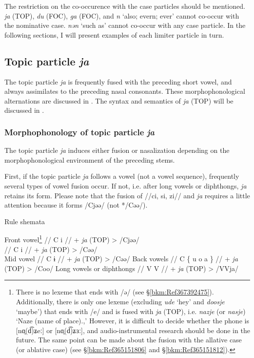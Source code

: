 The restriction on the co-occurence with the case particles should be mentioned. \textit{ja} (TOP), \textit{du} (FOC), \textit{ga} (FOC), and \textit{n} ‘also; evern; ever’ cannot co-occur with the nominative case. \textit{nən} ‘such as’ cannot co-occur with any case particle. In the following sections, I will present examples of each limiter particle in turn.

\subsection{Topic particle \textit{ja}}\label{sec:10.1.1}

The topic particle \textit{ja} is frequently fused with the preceding short vowel, and always assimilates to the preceding nasal consonants. These morphophonological alternations are discussed in . The syntax and semantics of \textit{ja} (TOP) will be discussed in .

\subsubsection{Morphophonology of topic particle \textit{ja}}\label{sec:10.1.1.1}

The topic particle \textit{ja} induces either fusion or nasalization depending on the morphophonological environment of the preceding stems.

First, if the topic particle \textit{ja} follows a vowel (not a vowel sequence), frequently several types of vowel fusion occur. If not, i.e. after long vowels or diphthongs, \textit{ja} retains its form. Please note that the fusion of //ci, si, zi// and \textit{ja} requires a little attention because it forms /Cjəə/ (not */Cəə/).

\begin{exe}
\ex \label{ex:10.1} Rule shemata\\
  \begin{xlist}
  \exi{}Front vowel\footnote{There is no lexeme that ends with /ə/ (see §\ref{bkm:Ref367392475}). Additionally, there is only one lexeme (excluding \textit{ude} ‘hey’ and \textit{doosje} ‘maybe’) that ends with /e/ and is fused with \textit{ja} (TOP), i.e. \textit{nazje} (or \textit{nasje}) ‘Naze (name of place).,’ However, it is difficult to decide whether the phone is [nɑ̟(d͡)ʑeː] or [nɑ̟(d͡)ʑɜː], and audio-instrumental research should be done in the future. The same point can be made about the fusion with the allative case (or ablative case) (see §\ref{bkm:Ref365151806} and §\ref{bkm:Ref365151812}).}
  \ex  //  C  i  //  +  \textit{ja} (TOP)  >  /Cjəə/\\\relax     [C is //c, s, z//]
  \ex  //  C  i  //  +  \textit{ja} (TOP)  >  /Cəə/\\\relax    [C is not //c, s, z//]
  \exi{} Mid vowel
  \ex  //  C  ɨ  //  +  \textit{ja} (TOP)  >  /Cəə/
  \exi{}Back vowels
  \ex  //   C  \{ u o a \}  //  +  \textit{ja} (TOP)  >  /Coo/
  \exi{}Long vowels or diphthongs
  \ex  //  V  V  //  +  \textit{ja} (TOP)  >  /VVja/
  \end{xlist}
\end{exe}

